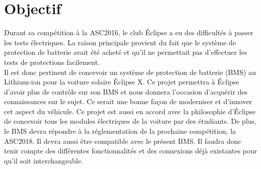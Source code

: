 \section{Objectif}
Durant sa compétition à la ASC2016, le club Éclipse a eu des difficultés à passer les tests électriques. La raison principale provient du fait que le système de protection de batterie avait été acheté et qu’il ne permettait pas d’effectuer les tests de protections facilement.\\

Il est donc pertinent de concevoir un système de protection de batterie (BMS) au Lithium-ion pour la voiture solaire Éclipse X. Ce projet permettra à Éclipse d’avoir plus de contrôle sur son BMS et nous donnera l’occasion d’acquérir des connaissances sur le sujet. Ce serait une bonne façon de moderniser et d'innover cet aspect du véhicule. Ce projet est aussi en accord avec la philosophie d’Éclipse de concevoir tous les modules électriques de la voiture par des étudiants. De plus, le BMS devra répondre à la réglementation de la prochaine compétition, la ASC2018. Il devra aussi être compatible avec le présent BMS. Il faudra donc tenir compte des différentes fonctionnalités et des connexions déjà existantes pour qu’il soit interchangeable.